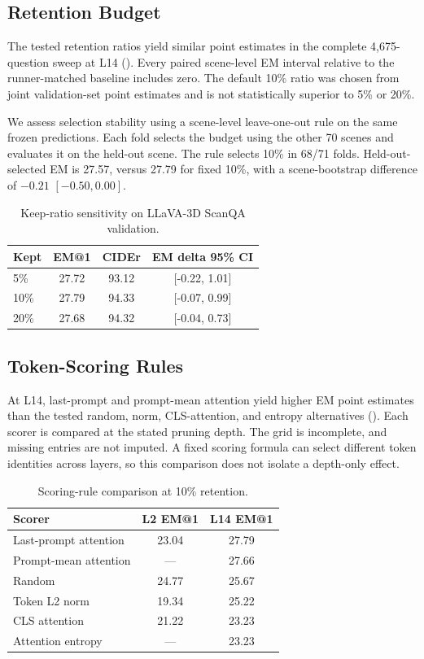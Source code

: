 \subsection{Retention Budget}
\label{sec:supp_keep_ratio}

The tested retention ratios yield similar point estimates in the complete 4,675-question sweep at L14 (). Every paired scene-level EM interval relative to the runner-matched baseline includes zero. The default 10\% ratio was chosen from joint validation-set point estimates and is not statistically superior to 5\% or 20\%.

We assess selection stability using a scene-level leave-one-out rule on the same frozen predictions. Each fold selects the budget using the other 70 scenes and evaluates it on the held-out scene. The rule selects 10\% in 68/71 folds. Held-out-selected EM is 27.57, versus 27.79 for fixed 10\%, with a scene-bootstrap difference of $-0.21$ $[-0.50,0.00]$.

\begin{table}[t]
\centering
\caption{Keep-ratio sensitivity on LLaVA-3D ScanQA validation.}
\label{tab:supp_ratio}
\begin{tabular}{lccc}
\toprule
Kept & EM@1 & CIDEr & EM delta 95\% CI \\
\midrule
5\% & 27.72 & 93.12 & [-0.22, 1.01] \\
10\% & 27.79 & 94.33 & [-0.07, 0.99] \\
20\% & 27.68 & 94.32 & [-0.04, 0.73] \\
\bottomrule
\end{tabular}
\end{table}

\subsection{Token-Scoring Rules}
\label{sec:supp_scorers}

At L14, last-prompt and prompt-mean attention yield higher EM point estimates than the tested random, norm, CLS-attention, and entropy alternatives (). Each scorer is compared at the stated pruning depth. The grid is incomplete, and missing entries are not imputed. A fixed scoring formula can select different token identities across layers, so this comparison does not isolate a depth-only effect.

\begin{table}[t]
\centering
\caption{Scoring-rule comparison at 10\% retention.}
\label{tab:supp_scorer}
\begin{tabular}{lcc}
\toprule
Scorer & L2 EM@1 & L14 EM@1 \\
\midrule
Last-prompt attention & 23.04 & 27.79 \\
Prompt-mean attention & --- & 27.66 \\
Random & 24.77 & 25.67 \\
Token L2 norm & 19.34 & 25.22 \\
CLS attention & 21.22 & 23.23 \\
Attention entropy & --- & 23.23 \\
\bottomrule
\end{tabular}
\end{table}

